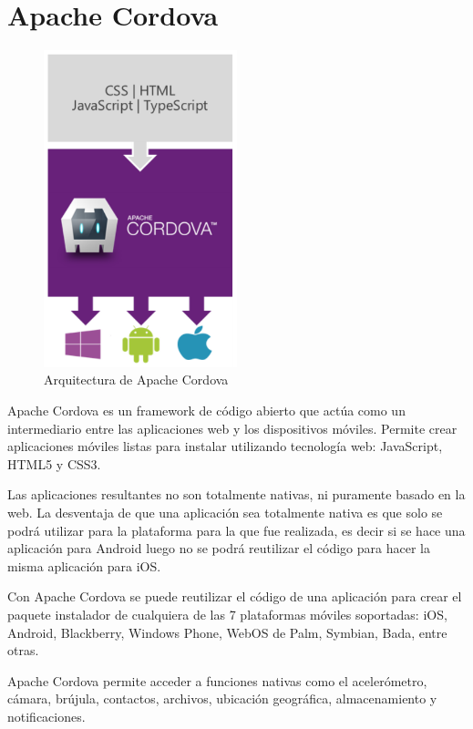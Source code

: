 \section{Apache Cordova}

\begin{figure}[H]
  \centering
    \includegraphics[width=0.5\textwidth]{imagenes/cordova-architecture.png}
    
     \caption{Arquitectura de Apache Cordova}
    \label{arquitectura-Apache Cordova}
\end{figure}

Apache Cordova es un \gls{framework} de código abierto que actúa como un intermediario entre las aplicaciones web y los dispositivos móviles. Permite crear aplicaciones móviles listas para instalar utilizando tecnología web: JavaScript, HTML5 y CSS3.

Las aplicaciones resultantes no son totalmente nativas, ni puramente basado en la web. La desventaja de que una aplicación sea totalmente nativa es que solo se podrá utilizar para la plataforma para la que fue realizada, es decir si se hace una aplicación para Android luego no se podrá reutilizar el código para hacer la misma aplicación para iOS.

Con Apache Cordova se puede reutilizar el código de una aplicación para crear el paquete instalador de cualquiera de las 7 plataformas móviles soportadas: iOS, Android, Blackberry, Windows Phone, WebOS de Palm, Symbian, Bada, entre otras.

Apache Cordova permite acceder a funciones nativas como el acelerómetro, cámara, brújula, contactos, archivos, ubicación geográfica, almacenamiento  y notificaciones.

